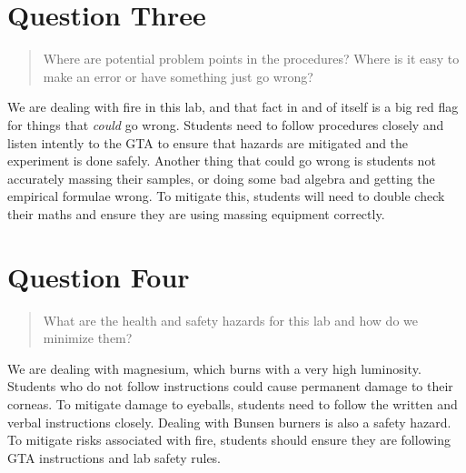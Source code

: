 \documentclass[12pt, letterpaper]{article}
\begin{document}
\section{Question Three}
\begin{quote}
    Where are potential problem points in the procedures? Where is it easy to make an error 
    or have something just go wrong?
\end{quote}
We are dealing with fire in this lab, and that fact in and of itself is a big red flag for 
things that \textit{could} go wrong.
Students need to follow procedures closely and listen intently to the GTA to ensure that
hazards are mitigated and the experiment is done safely.
Another thing that could go wrong is students not accurately massing their samples, or doing
some bad algebra and getting the empirical formulae wrong.
To mitigate this, students will need to double check their maths and ensure they are 
using massing equipment correctly.

\section{Question Four}
\begin{quote}
    What are the health and safety hazards for this lab and how do we minimize them?
\end{quote}
 We are dealing with magnesium, which burns with a very high luminosity.
 Students who do not follow instructions could cause permanent damage to their corneas.
 To mitigate damage to eyeballs, students need to follow the written and verbal
 instructions closely.
 Dealing with Bunsen burners is also a safety hazard.
 To mitigate risks associated with fire, students should ensure they are following
 GTA instructions and lab safety rules.
\end{document}
